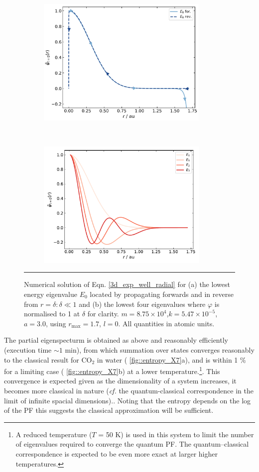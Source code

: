 \documentclass[../main.tex]{subfiles}
\begin{document}
\begin{figure}[h!]
	\begin{subfigure}[t]{0.5\textwidth}
		\centering
		\includegraphics[height=6.2cm]{4/figs/figX6/first_eigenfunction_lines.png}
		\caption{}
	\end{subfigure}%
	~ 
	\begin{subfigure}[t]{0.5\textwidth}
		\centering
		\includegraphics[height=6.2cm]{4/figs/figX6/eigenfunctions.pdf}
		\caption{}
	\end{subfigure}
	\vspace{0.2cm}
	\hrule
	\caption{Numerical solution of Eqn. \eqref{3d_exp_well_radial} for (a) the lowest energy eigenvalue $E_0$ located by propagating forwards and in reverse from $r = \delta : \delta \ll 1$ and (b) the lowest four eigenvalues where $\varphi$ is normalised to 1 at $\delta$ for clarity. $m =8.75 \times 10^4$,$k = 5.47 \times 10^{-5}$, $a = 3.0$, using $r_\text{max} = 1.7$, $l = 0$. All quantities in atomic units.} 
	\label{fig::entropy_X6}
\end{figure}

The partial eigenspecturm is obtained as above and reasonably efficiently (execution time $\sim1$ min), from which summation over states converges reasonably to the classical result for CO$_2$ in water (\figurename{ \ref{fig::entropy_X7}a}), and is within 1 \% for a limiting case (\figurename{ \ref{fig::entropy_X7}b}) at a lower temperature.\footnote{A reduced temperature ($T$ = 50 K) is used in this system to limit the number of  eigenvalues required to converge the quantum PF. The quantum--classical correspondence is expected to be even more exact at larger higher temperatures.}. This convergence is expected given as the dimensionality of a system increases, it becomes more classical in nature (\emph{cf.} the quantum-classical correspondence in the limit of infinite spacial dimensions).\cite{QuantClassCorrespondence}. Noting that the entropy depends on the log of the PF this suggests the classical approximation will be sufficient.
\end{document}
